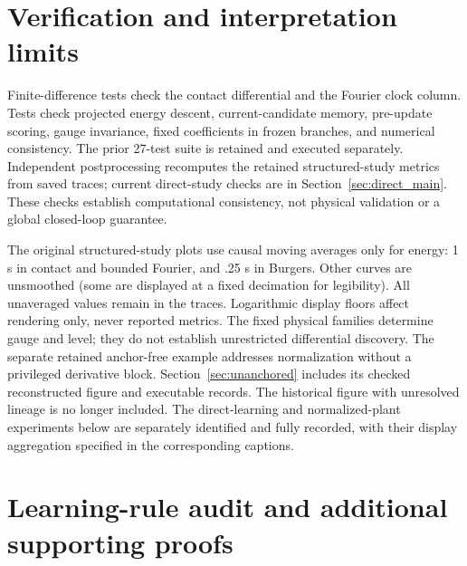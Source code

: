 \documentclass[journal]{IEEEtran}
\begin{document}
\section{Verification and interpretation limits}
Finite-difference tests check the contact differential and the Fourier clock
column. Tests check projected energy descent, current-candidate memory,
pre-update scoring, gauge invariance, fixed coefficients in frozen branches,
and numerical consistency. The prior 27-test suite is retained and executed
separately. Independent postprocessing recomputes the retained structured-study metrics
from saved traces; current direct-study checks are in
Section~\ref{sec:direct_main}. These checks establish computational consistency, not physical
validation or a global closed-loop guarantee.

The original structured-study plots use causal moving averages only for
energy: 1 s in contact and bounded Fourier, and .25 s in Burgers. Other curves are unsmoothed (some are displayed
at a fixed decimation for legibility). All unaveraged values remain in the
traces. Logarithmic display floors affect rendering only, never reported
metrics. The fixed physical families determine gauge and level; they do not
establish unrestricted differential discovery. The separate retained anchor-free
example addresses normalization without a privileged derivative block.
Section~\ref{sec:unanchored} includes its checked reconstructed figure and
executable records. The historical figure with unresolved lineage is no
longer included. The direct-learning and normalized-plant experiments below
are separately identified and fully recorded, with their display aggregation
specified in the corresponding captions.

\clearpage
\newtheorem{auditproposition}{Proposition}
\renewcommand{\theauditproposition}{S.A\arabic{auditproposition}}

\section{Learning-rule audit and additional supporting proofs}
\label{sec:learning_rule_audit}
\end{document}
